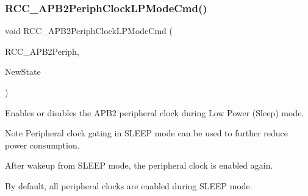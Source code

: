 \subsubsection{\texorpdfstring{R\+C\+C\+\_\+\+A\+P\+B2\+Periph\+Clock\+L\+P\+Mode\+Cmd()}{RCC\_APB2PeriphClockLPModeCmd()}}
{\footnotesize\ttfamily void R\+C\+C\+\_\+\+A\+P\+B2\+Periph\+Clock\+L\+P\+Mode\+Cmd (\begin{DoxyParamCaption}\item[{uint32\+\_\+t}]{R\+C\+C\+\_\+\+A\+P\+B2\+Periph,  }\item[{Functional\+State}]{New\+State }\end{DoxyParamCaption})}



Enables or disables the A\+P\+B2 peripheral clock during Low Power (Sleep) mode. 

\begin{DoxyNote}{Note}
Peripheral clock gating in S\+L\+E\+EP mode can be used to further reduce power consumption. 

After wakeup from S\+L\+E\+EP mode, the peripheral clock is enabled again. 

By default, all peripheral clocks are enabled during S\+L\+E\+EP mode. 
\end{DoxyNote}

